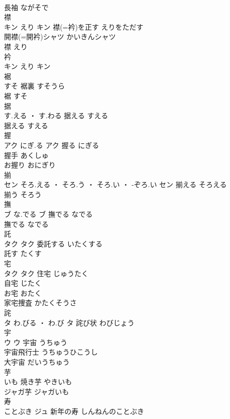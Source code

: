 \documentclass[8pt]{extreport}
\begin{document}
\begin{CJK}{UTF8}{min}
\\	長袖	ながそで	
\\	襟	
\\	キン	えり	キン	襟(=衿)を正す	えりをただす	
\\	開襟(=開衿)シャツ	かいきんシャツ	
\\	襟	えり	
\\	衿	
\\	キン	えり	キン																																			
\\	裾	
\\	すそ		裾裏	すそうら	
\\	裾	すそ	
\\	据	
\\	す.える ・ す.わる		据える	すえる	
\\	据える	すえる	
\\	握	
\\	アク	にぎ.る	アク	握る	にぎる	
\\	握手	あくしゅ	
\\	お握り	おにぎり	
\\	揃	
\\	セン	そろ.える ・ そろ.う ・ そろ.い ・ -ぞろ.い	セン	揃える	そろえる	
\\	揃う	そろう	
\\	撫	
\\	ブ	な.でる	ブ	撫でる	なでる	
\\	撫でる	なでる	
\\	託	
\\	タク		タク	委託する	いたくする	
\\	託す	たくす	
\\	宅	
\\	タク		タク	住宅	じゅうたく	
\\	自宅	じたく	
\\	お宅	おたく	
\\	家宅捜査	かたくそうさ	
\\	詫	
\\	タ	わ.びる ・ わ.び	タ													詫び状	わびじょう	
\\	宇	
\\	ウ		ウ	宇宙	うちゅう	
\\	宇宙飛行士	うちゅうひこうし	
\\	大宇宙	だいうちゅう	
\\	芋	
\\	いも		焼き芋	やきいも	
\\	ジャガ芋	ジャガいも	
\\	寿	
\\	ことぶき	ジュ	新年の寿	しんねんのことぶき	

\end{CJK}
\end{document}
